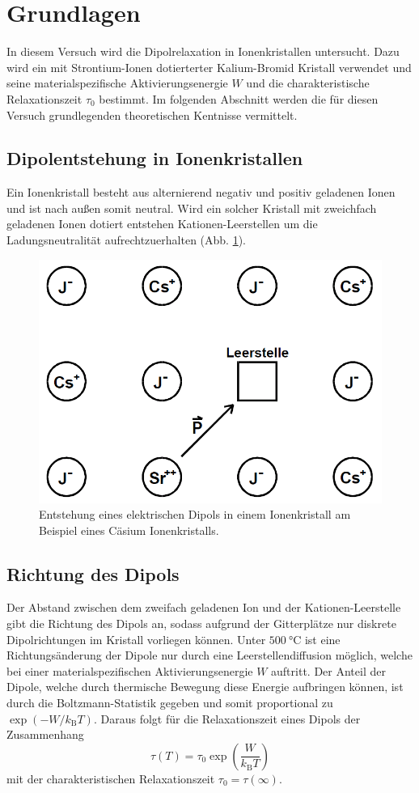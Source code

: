 \section{Grundlagen}
\label{sec:grundlagen}

In diesem Versuch wird die Dipolrelaxation in Ionenkristallen untersucht. 
Dazu wird ein mit Strontium-Ionen dotierterter Kalium-Bromid Kristall verwendet und seine materialspezifische Aktivierungsenergie $W$ und die charakteristische Relaxationszeit $\tau_0$ bestimmt.
Im folgenden Abschnitt werden die für diesen Versuch grundlegenden theoretischen Kentnisse vermittelt.
\FloatBarrier

\subsection{Dipolentstehung in Ionenkristallen} %
\label{sub:dipolentstehung_in_ionenkristallen}

Ein Ionenkristall besteht aus alternierend negativ und positiv geladenen Ionen und ist nach außen somit neutral.
Wird ein solcher Kristall mit zweichfach geladenen Ionen dotiert entstehen Kationen-Leerstellen um die Ladungsneutralität aufrechtzuerhalten (Abb. \ref{fig:dipol}). 
\begin{figure}
    \centering
    \includegraphics[width=0.5\linewidth]{data/Dipol.png}
    \caption{Entstehung eines elektrischen Dipols in einem Ionenkristall am Beispiel eines Cäsium Ionenkristalls.}
    \label{fig:dipol}
\end{figure}

\subsection{Richtung des Dipols} %
\label{sub:richtung_des_dipols}

Der Abstand zwischen dem zweifach geladenen Ion und der Kationen-Leerstelle gibt die Richtung des Dipols an, sodass aufgrund der Gitterplätze nur diskrete Dipolrichtungen im Kristall vorliegen können.
Unter $\SI{500}{\celsius}$ ist eine Richtungsänderung der Dipole nur durch eine Leerstellendiffusion möglich, welche bei einer materialspezifischen Aktivierungsenergie $W$ auftritt.
Der Anteil der Dipole, welche durch thermische Bewegung diese Energie aufbringen können, ist durch die Boltzmann-Statistik gegeben und somit proportional zu $\exp{\left(-W/k_\text{B}T\right)}$.
Daraus folgt für die Relaxationszeit eines Dipols der Zusammenhang
\begin{equation}
    \tau(T) = \tau_0 \exp{\left(\frac{W}{k_\text{B}T}\right)}
\end{equation}
mit der charakteristischen Relaxationszeit $\tau_0 = \tau(\infty)$.

